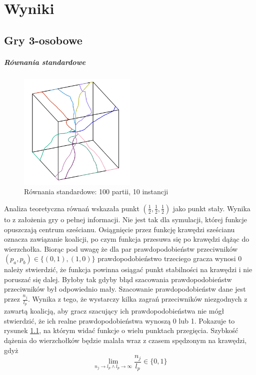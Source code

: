 \chapter{Wyniki}
\label{cha:wyniki}

\section{Gry 3-osobowe}
\label{sec:N3nzal}

\paragraph{Równania standardowe}
\label{sec:r_stan}
\begin{figure}
    \centering
    \includegraphics[width=0.5\textwidth]{pict/wyniki/stand100_10.png}   
    \caption{Równania standardowe: 100 partii, 10 instancji}
	\label{fig:stand100_10} 
\end{figure}

Analiza teoretyczna równań wskazała punkt $(\frac{1}{2},\frac{1}{2},\frac{1}{2})$ jako punkt stały. Wynika to z założenia gry o pełnej informacji. Nie jest tak dla symulacji, której funkcje opuszczają centrum sześcianu. Osiągnięcie przez funkcję krawędzi sześcianu oznacza zawiązanie koalicji, po czym funkcja przesuwa się po krawędzi dążąc do wierzchołka. Biorąc pod uwagę że dla par prawdopodobieństw przeciwników $(p_a,p_b) \in \{(0,1),(1,0)\}$ prawdopodobieństwo trzeciego gracza wynosi $0$ należy stwierdzić, że funkcja powinna osiągać punkt stabilności na krawędzi i nie poruszać się dalej. Byłoby tak gdyby błąd szacowania prawdopodobieństw przeciwników był odpowiednio mały. Szacowanie prawdopodobieństw dane jest przez $\frac{n_{j}}{l_p}$. Wynika z tego, że wystarczy kilka zagrań przeciwników niezgodnych z zawartą koalicją, aby gracz szacujący ich prawdopodobieństwa nie mógł stwierdzić, że ich realne prawdopodobieństwa wynoszą 0 lub 1. Pokazuje to rysunek \ref{fig:stand100_10}, na którym widać funkcje o wielu punktach przegięcia. Szybkość dążenia do wierzchołków będzie malała wraz z czasem spędzonym na krawędzi, gdyż 
\[\lim_{n_j\rightarrow l_p \wedge l_p \rightarrow \infty} \frac{n_j}{l_p} \in \{0,1\} \]

